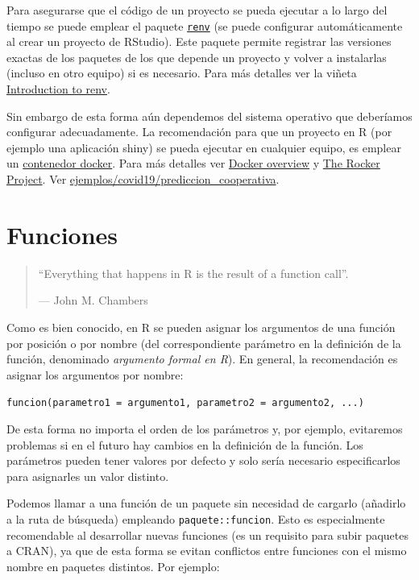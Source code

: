 \documentclass[
]{book}
\theoremstyle{break}
\theoremstyle{nonumberplain}
\begin{document}
Para asegurarse que el código de un proyecto se pueda ejecutar a lo largo del tiempo se puede emplear el paquete \href{https://rstudio.github.io/renv/}{\texttt{renv}} (se puede configurar automáticamente al crear un proyecto de RStudio).
Este paquete permite registrar las versiones exactas de los paquetes de los que depende un proyecto y volver a instalarlas (incluso en otro equipo) si es necesario. Para más detalles ver la viñeta \href{https://rstudio.github.io/renv/articles/renv.html}{Introduction to renv}.

Sin embargo de esta forma aún dependemos del sistema operativo que deberíamos configurar adecuadamente.
La recomendación para que un proyecto en R (por ejemplo una aplicación shiny) se pueda ejecutar en cualquier equipo, es emplear un \href{https://es.wikipedia.org/wiki/Docker_(software)}{contenedor docker}.
Para más detalles ver \href{https://docs.docker.com/get-started/overview/}{Docker overview} y \href{https://rocker-project.org/}{The Rocker Project}.
Ver \href{ejemplos/covid19/prediccion_cooperativa/vii_xornadasr.html}{ejemplos/covid19/prediccion\_cooperativa}.

\hypertarget{funciones}{%
\section{Funciones}\label{funciones}}

\begin{quote}
``Everything that happens in R is the result of a function call''.

--- John M. Chambers
\end{quote}

Como es bien conocido, en R se pueden asignar los argumentos de una función por posición o por nombre (del correspondiente parámetro en la definición de la función, denominado \emph{argumento formal en R}).
En general, la recomendación es asignar los argumentos por nombre:

\texttt{funcion(parametro1\ =\ argumento1,\ parametro2\ =\ argumento2,\ ...)}

De esta forma no importa el orden de los parámetros y, por ejemplo, evitaremos problemas si en el futuro hay cambios en la definición de la función.
Los parámetros pueden tener valores por defecto y solo sería necesario especificarlos para asignarles un valor distinto.

Podemos llamar a una función de un paquete sin necesidad de cargarlo (añadirlo a la ruta de búsqueda) empleando \texttt{paquete::funcion}.
Esto es especialmente recomendable al desarrollar nuevas funciones (es un requisito para subir paquetes a CRAN), ya que de esta forma se evitan conflictos entre funciones con el mismo nombre en paquetes distintos.
Por ejemplo:
\end{document}
